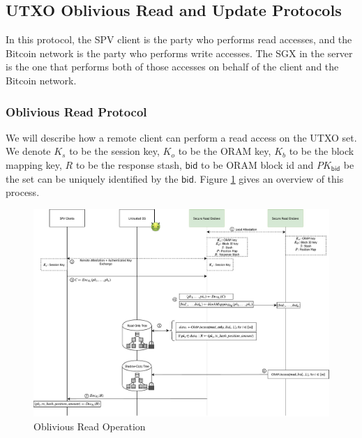 \subsection{UTXO Oblivious Read and Update Protocols}
\label{sub:oRAM operations}
In this protocol, the SPV client is the party who performs read accesses, and the Bitcoin network is the party who performs write accesses. 
The SGX in the server is the one that performs both of those accesses on behalf of the client and the Bitcoin network.

\subsubsection{Oblivious Read Protocol}
We will describe how a remote client can perform a read access on the UTXO set. 
We denote $K_s$ to be the session key, $K_o$ to be the ORAM key, $K_b$ to be the block mapping key, $R$ to be the response stash, $\mathsf{bid}$ to be ORAM block id and $PK_\mathsf{bid}$ be the set can be uniquely identified by the $\mathsf{bid}$. 
Figure \ref{fig:overview-read} gives an overview of this process.
\begin{figure}[t]
	\centering
	\includegraphics[width=\columnwidth]{fig/Client-Read.pdf}
	\caption{Oblivious Read Operation}
	\label{fig:overview-read}
\end{figure}
